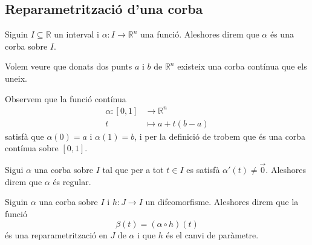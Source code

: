 \documentclass[../Apunts.tex]{subfiles}
\begin{document}
	\subsection{Reparametrització d'una corba}
	\begin{definition}[Corba]
		\label{def:corba}
		Siguin \(I\subseteq\mathbb{R}\) un interval i \(\alpha\colon I\longrightarrow\mathbb{R}^{n}\) una funció. Aleshores direm que \(\alpha\) és una corba sobre \(I\).
	\end{definition}
	\begin{example}
		\label{ex:corba que uniex dos punts}
		Volem veure que donats dos punts \(a\) i \(b\) de \(\mathbb{R}^{n}\) existeix una corba contínua que els uneix.
		\begin{solution}
			Observem que la funció contínua %
			\begin{align*}
				\alpha\colon[0,1]&\longrightarrow\mathbb{R}^{n} \\
				t&\longmapsto a+t(b-a)
			\end{align*}
			satisfà que \(\alpha(0)=a\) i \(\alpha(1)=b\), i per la definició de  trobem que és una corba contínua sobre \([0,1]\).
		\end{solution}
	\end{example}
	\begin{definition}
		\label{def:corba regular}
		Sigui \(\alpha\) una corba sobre \(I\) tal que per a tot \(t\in I\) es satisfà \(\alpha'(t)\neq\vec{0}\). Aleshores direm que \(\alpha\) és regular.
	\end{definition}
	\begin{definition}[Reparametrització]
		\label{def:reparametrització d'una corba}
		\label{def:canvi de paràmetre}
		Siguin \(\alpha\) una corba sobre \(I\) i \(h\colon J\longrightarrow I\) un difeomorfisme. Aleshores direm que la funció
		\[\beta(t)=(\alpha\circ h)(t)\]
		és una reparametrització en \(J\) de \(\alpha\) i que \(h\) és el canvi de paràmetre.
	\end{definition}
\end{document}
